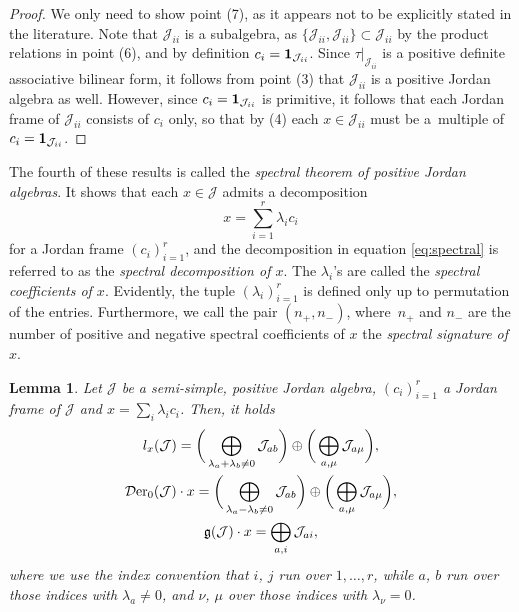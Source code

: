 \documentclass[10pt,a4paper]{amsart}
\numberwithin{equation}{section}
\newtheorem{Lemma}[Theorem]{Lemma}
\newcommand{\be}{\begin{equation}}
\newcommand{\ee}{\end{equation}}
\newcommand{\Der}{\mathcal{D}{\rm er}}
\newcommand{\Jcal}{\mathcal{J}}
\newcommand{\g}{{\mathfrak{g}}}
\begin{document}
\begin{proof}
We only need to show point (7), as it appears not to be explicitly stated in the literature.
Note that $\Jcal_{ii}$ is a subalgebra, as $\{\Jcal_{ii}, \Jcal_{ii}\} \subset \Jcal_{ii}$ by the product relations in point (6), and by definition $c_i = {\bf 1}_{\Jcal_{ii}}$.
Since $\tau|_{\Jcal_{ii}}$ is a positive definite associative bilinear form, it follows from point (3) that $\Jcal_{ii}$ is a positive Jordan algebra as well. However, since $c_i = {\bf 1}_{\Jcal_{ii}}$ is primitive, it follows that each Jordan frame of $\Jcal_{ii}$ consists of $c_i$ only, so that by (4) each $x \in \Jcal_{ii}$ must be a~multiple of $c_i = {\bf 1}_{\Jcal_{ii}}$.
\end{proof}

The fourth of these results is called the {\em spectral theorem of positive Jordan algebras}. It shows that each $x \in \Jcal$ admits a decomposition
\be \label{eq:spectral}
x = \sum_{i=1}^r \lambda_i c_i
\ee
for a Jordan frame $(c_i)_{i=1}^r$, and the decomposition in equation \eqref{eq:spectral} is referred to as the {\em spectral decomposition of $x$}.
The $\lambda_i$'s are called the {\em spectral coefficients of $x$}.
Evidently, the tuple $(\lambda_i)_{i=1}^r$ is defined only up to permutation of the entries.
Furthermore, we call the pair $(n_+, n_-)$, where~$n_+$ and $n_-$ are the number of positive and negative spectral coefficients of $x$ the {\em spectral signature of $x$}.



\begin{Lemma} \label{lem:orbits}
Let $\Jcal$ be a semi-simple, positive Jordan algebra, $(c_i)_{i=1}^r$ a Jordan frame of $\Jcal$ and $x = \sum_i \lambda_i c_i$.
Then, it holds
\begin{gather}
l_x(\Jcal) =\bigg( \bigoplus_{\lambda_a + \lambda_b \neq 0} \Jcal_{ab} \bigg)\oplus \bigg(\bigoplus_{a, \mu} \Jcal_{a\mu}\bigg),\nonumber\\
\Der_0(\Jcal) \cdot x = \bigg(\bigoplus_{\lambda_a - \lambda_b \neq 0} \Jcal_{ab}\bigg) \oplus \bigg(\bigoplus_{a, \mu} \Jcal_{a\mu}\bigg),\nonumber\\
\g(\Jcal) \cdot x = \bigoplus_{a,i} \Jcal_{ai},\label{eq:orbit-xlambda}
\end{gather}
where we use the index convention that $i$, $j$ run over $1, \dots, r$, while $a$, $b$ run over those indices with $\lambda_a \neq 0$, and $\nu$, $\mu$ over those indices with $\lambda_\nu = 0$.
\end{Lemma}
\end{document}
